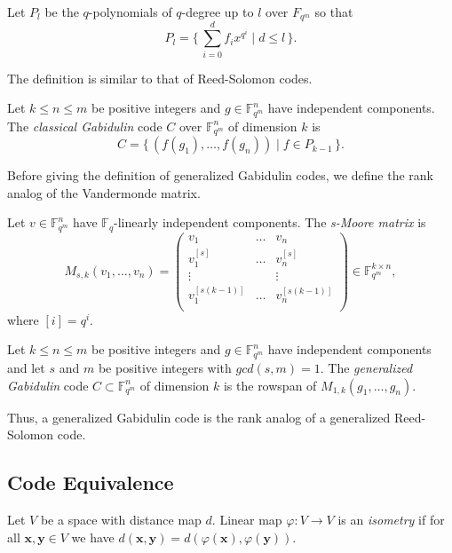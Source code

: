 Let $P_l$ be the $q$-polynomials of $q$-degree up to $l$ over $F_{q^m}$ so that
\[
P_l = \{\, \sum_{i=0}^df_ix^{q^i} \mid d \leq l \,\}.
\]

The definition is similar to that of Reed-Solomon codes.

\begin{definition}
Let $k \leq n \leq m$ be positive integers and $g \in \mathbb{F}_{q^m}^n$ have independent components. The \textit{classical Gabidulin} code $C$ over $\mathbb{F}_{q^m}^n$ of dimension $k$ is
\[
C = 
\{\, (f(g_1), \dots, f(g_n)) \mid f \in P_{k-1} \, \}.
\]
\end{definition}
Before giving the definition of generalized Gabidulin codes, we define the rank analog of the Vandermonde matrix.

\begin{definition}
Let $v \in \mathbb{F}_{q^m}^n$ have $\mathbb{F}_q$-linearly independent components. The \textit{s-Moore matrix} is
\[
M_{s, k}(v_1, \dots, v_n) = 
\begin{pmatrix}
    v_1 &\dots& v_n \\
    v_1^{[s]} &\dots& v_n^{[s]} \\
    \vdots && \vdots \\
    v_1^{[s(k-1)]} &\dots& v_n^{[s(k-1)]} \\
\end{pmatrix} \in \mathbb{F}_{q^m}^{k \times n},
\]
where $[i] = q^i$.
\end{definition}

\begin{definition}
Let $k \leq n \leq m$ be positive integers and $g \in \mathbb{F}_{q^m}^n$ have independent components and let $s$ and $m$  be positive integers with $gcd(s, m) = 1$. The \textit{generalized Gabidulin} code $C \subset \mathbb{F}_{q^m}^n$ of dimension $k$ is the rowspan of $M_{1, k}(g_1, \dots, g_n)$.    
\end{definition}

Thus, a generalized Gabidulin code is the rank analog of a generalized Reed-Solomon code.

\subsection{Code Equivalence}

\begin{definition}[Isometry]
Let $V$ be a space with distance map $d$. Linear map $\varphi: V \xrightarrow{}V$ is an \textit{isometry} if for all $\mathbf{x}, \mathbf{y} \in V$ we have $d(\mathbf{x}, \mathbf{y}) = d(\varphi(\mathbf{x}), \varphi(\mathbf{y}))$.    
\end{definition}

